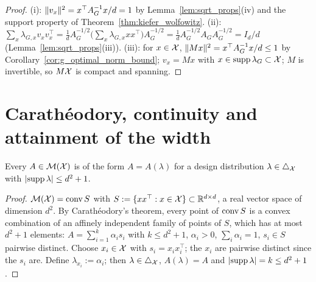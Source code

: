 \begin{proof}
\leanok
{}
(i): $\lVert v_x \rVert^2 = x^\top A_G^{-1}x/d = 1$ by Lemma~\ref{lem:sqrt_props}(iv) and the support
property of Theorem~\ref{thm:kiefer_wolfowitz}. (ii):
$\sum_x\lambda_{G,x}v_xv_x^\top = \frac1d A_G^{-1/2}\big(\sum_x\lambda_{G,x}xx^\top\big)A_G^{-1/2}
= \frac1d A_G^{-1/2}A_GA_G^{-1/2} = I_d/d$ (Lemma~\ref{lem:sqrt_props}(iii)). (iii): for
$x \in \mathcal{X}$, $\lVert Mx \rVert^2 = x^\top A_G^{-1}x/d \le 1$ by Corollary~\ref{cor:g_optimal_norm_bound};
$v_x = Mx$ with $x \in \operatorname{supp}\lambda_G \subset \mathcal{X}$; $M$ is invertible, so $M\mathcal{X}$ is compact and
spanning.
\end{proof}

\section{Carath\'eodory, continuity and attainment of the width}
\label{sec:design_caratheodory}

\begin{lemma}\label{lem:caratheodory_design}
\leanok
{}
Every $A \in \mathcal{M}(\mathcal{X})$ is of the form $A = A(\lambda)$ for a design distribution
$\lambda \in \triangle_{\mathcal{X}}$ with $\lvert \operatorname{supp}\lambda \rvert \le d^2 + 1$.
\end{lemma}

\begin{proof}
\leanok
{}
$\mathcal{M}(\mathcal{X}) = \operatorname{conv} S$ with $S := \{xx^\top : x \in \mathcal{X}\} \subset \mathbb{R}^{d\times d}$, a real
vector space of dimension $d^2$. By Carath\'eodory's theorem, every point of $\operatorname{conv} S$
is a convex combination of an affinely independent family of points of $S$, which has at most
$d^2 + 1$ elements: $A = \sum_{i=1}^k \alpha_i s_i$ with $k \le d^2+1$, $\alpha_i > 0$,
$\sum_i\alpha_i = 1$, $s_i \in S$ pairwise distinct. Choose $x_i \in \mathcal{X}$ with $s_i = x_ix_i^\top$;
the $x_i$ are pairwise distinct since the $s_i$ are. Define $\lambda_{x_i} := \alpha_i$; then
$\lambda \in \triangle_{\mathcal{X}}$, $A(\lambda) = A$ and $\lvert \operatorname{supp}\lambda \rvert = k \le d^2 + 1$.
\end{proof}

